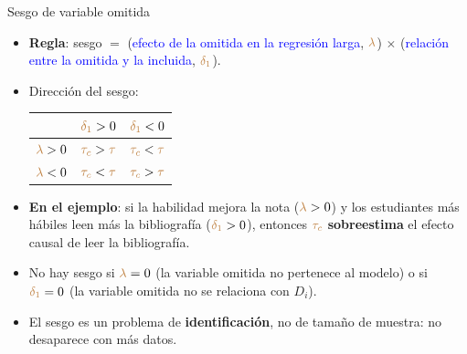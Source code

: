 \documentclass[9pt, xcolor=dvipsnames]{beamer}
\begin{document}
\begin{frame}{Sesgo de variable omitida}
\begin{itemize}
    \item \textbf{Regla}: sesgo \(=\) (\textcolor{blue}{efecto de la omitida en la regresión larga}, \(\textcolor{brown}{\lambda}\)) \(\times\) (\textcolor{blue}{relación entre la omitida y la incluida}, \(\textcolor{brown}{\delta_1}\)).
    \item Dirección del sesgo:
    \begin{center}
    \begin{tabular}{lcc}
        \toprule
          & \(\textcolor{brown}{\delta_1} > 0\) & \(\textcolor{brown}{\delta_1} < 0\) \\
        \midrule
        \(\textcolor{brown}{\lambda} > 0\) & \(\textcolor{brown}{\tau_c} > \textcolor{brown}{\tau}\) & \(\textcolor{brown}{\tau_c} < \textcolor{brown}{\tau}\) \\
        \(\textcolor{brown}{\lambda} < 0\) & \(\textcolor{brown}{\tau_c} < \textcolor{brown}{\tau}\) & \(\textcolor{brown}{\tau_c} > \textcolor{brown}{\tau}\) \\
        \bottomrule
    \end{tabular}
    \end{center}
    \vspace{1em}
    \item \textbf{En el ejemplo}: si la habilidad mejora la nota (\(\textcolor{brown}{\lambda} > 0\)) y los estudiantes más hábiles leen más la bibliografía (\(\textcolor{brown}{\delta_1} > 0\)), entonces \(\textcolor{brown}{\tau_c}\) \textbf{sobreestima} el efecto causal de leer la bibliografía.
    \item No hay sesgo si \(\textcolor{brown}{\lambda} = 0\) (la variable omitida no pertenece al modelo) o si \(\textcolor{brown}{\delta_1} = 0\) (la variable omitida no se relaciona con \(D_i\)).
    \item El sesgo es un problema de \textbf{identificación}, no de tamaño de muestra: no desaparece con más datos.
\end{itemize}
\end{frame}
\end{document}
